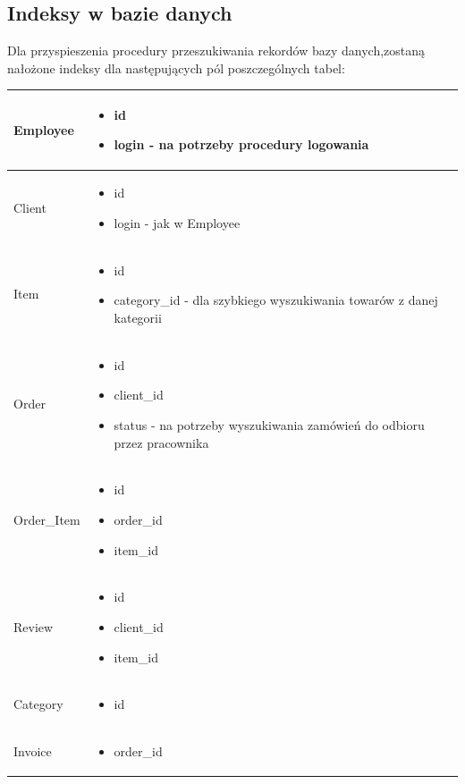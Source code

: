 \documentclass[10pt,a4paper]{article}
\begin{document}
  \subsection{Indeksy w bazie danych}
  Dla przyspieszenia procedury przeszukiwania rekordów bazy danych,zostaną nałożone indeksy dla następujących pól poszczególnych tabel:
  \flushleft
  \begin{longtable}{| m{3cm} | m{9cm} |}
  \hline
  Employee &  \begin{itemize}
  			  \item id
			  \item login - na potrzeby procedury logowania
			  \end{itemize}\\ \hline
  Client   &  \begin{itemize}
	    	  \item	id
    		  \item login - jak w Employee
			  \end{itemize}\\ \hline
  Item     &  \begin{itemize}
      		  \item id
    		  \item category\_id - dla szybkiego wyszukiwania towarów z danej kategorii
			  \end{itemize}\\ \hline
  Order    &  \begin{itemize}
      		  \item id
    		  \item client\_id
    		  \item status - na potrzeby wyszukiwania zamówień do odbioru przez pracownika
			  \end{itemize}\\ \hline
Order\_Item &  \begin{itemize}
	          \item id
	          \item order\_id
	          \item item\_id
			  \end{itemize}\\ \hline
Review	   &  \begin{itemize}
   			  \item id
   			  \item client\_id
   			  \item item\_id
			  \end{itemize}\\ \hline
Category   &  \begin{itemize}
		      \item id
			  \end{itemize}\\ \hline
Invoice	   &  \begin{itemize}
		      \item order\_id
			  \end{itemize}\\ \hline
  
   \end{longtable}
   \newpage
\end{document}
